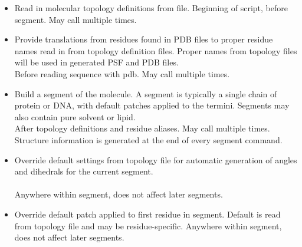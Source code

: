 \begin{itemize}

\item {}
{Read in molecular topology definitions from file.}
{}
{Beginning of script, before segment.  May call multiple times.}

\item {}
{Provide translations from residues found in PDB files to proper
residue names read in from topology definition files.  Proper names
from topology files will be used in generated PSF and PDB files.}
{\\
}
{Before reading sequence with pdb.  May call multiple times.}

\item {}
{Build a segment of the molecule.  A segment is typically a single
chain of protein or DNA, with default patches applied to the termini.
Segments may also contain pure solvent or lipid.}
{\\
}
{After topology definitions and residue aliases.  May call multiple times.
Structure information is generated at the end of every segment command.}

\item {}
{Override default settings from topology file for automatic generation of
angles and dihedrals for the current segment.}
{\\
\\
}
{Anywhere within segment, does not affect later segments.}

\item {}
{Override default patch applied to first residue in segment.
Default is read from topology file and may be residue-specific.}
{}
{Anywhere within segment, does not affect later segments.}


\end{itemize}
